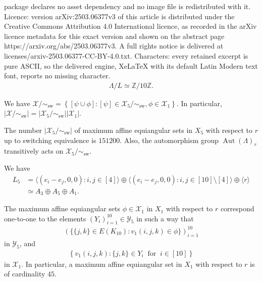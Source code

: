 \documentclass[10pt,a4paper]{amsart}
\DeclareMathOperator{\Aut}{Aut}
\DeclareMathOperator{\sw}{sw}
\newcommand{\Z}{\mathbb{Z}}
\newcommand{\aesf}{\psi}
\newcommand{\aeso}{\phi}
\newcommand{\aes}{\omega}
\newcommand{\cX}{\mathcal{X}}
\newcommand{\cY}{\mathcal{Y}}
\newcommand{\sr}{ r } %
\begin{document}
package declares no asset dependency and no image file is redistributed with it. Licence: version arXiv:2503.06377v3 of this article is distributed under the Creative Commons Attribution 4.0 International licence, as recorded in the arXiv licence metadata for this exact version and shown on the abstract page https://arxiv.org/abs/2503.06377v3. A full rights notice is delivered at licenses/arxiv-2503.06377-CC-BY-4.0.txt. Characters: every retained excerpt is pure ASCII, so the delivered engine, XeLaTeX with its default Latin Modern text font, reports no missing character.
	\begin{align}
		\Lambda / L \simeq \Z/10\Z. \label{1d}
	\end{align}

\begin{lem}	\label{lem:chi}
	We have
	$\cX/\sim_{\sw}
		= \left\{ [\aesf \cup \aeso] : [\aesf] \in \cX_5/\sim_{\sw}, \aeso \in \cX_1 \right\}.$
	In particular, $\left|\cX/\sim_{\sw} \right| = \left|\cX_5/\sim_{\sw} \right| \left| \cX_1 \right|.$
\end{lem}

\begin{lem}
	The number $|\cX_5/\sim_{\sw}|$ of maximum affine equiangular sets in $X_5$ with respect to $\sr$ up to switching equivalence is $151200$.	\label{lem:X5}
	Also, the automorphism group $\Aut(\Lambda)_{\sr}$ transitively acts on $\cX_5/\sim_{\sw}$.
\end{lem}

\begin{lem}	\label{lem:L5}
	We have
	\begin{align*}
		L_5 & = \langle (e_i-e_j,0,0) : i,j \in [4] \rangle \oplus \langle (e_i-e_j ,0,0): i,j \in [10]\setminus[4] \rangle \oplus \langle \sr \rangle \\
		    & \simeq A_3 \oplus A_5 \oplus A_1.
	\end{align*}
\end{lem}

\begin{lem}	\label{lem:X1Y10}
	The maximum affine equiangular sets $\aeso \in \cX_1$ in $X_1$ with respect to $\sr$ correspond one-to-one to the elements $(Y_i)_{i=1}^{10} \in \cY_{5}$ in such a way that
	\begin{align}	\label{lem:X1Y10:0}
		( \{ \{j,k\} \in E(K_{10}) : v_1(i,j,k) \in \aeso \} )_{i=1}^{10}  %
	\end{align}
	in $\cY_5$, and
	\begin{align}	\label{lem:X1Y10:1}
		\left\{ v_1(i,j,k) : \{j,k\} \in Y_i \ \text{ for }\ i \in [10] \right\}%
	\end{align}
	in $\cX_1$.
	In particular, a maximum affine equiangular set in $X_1$ with respect to $\sr$ is of cardinality $45$.
\end{lem}
\end{document}
